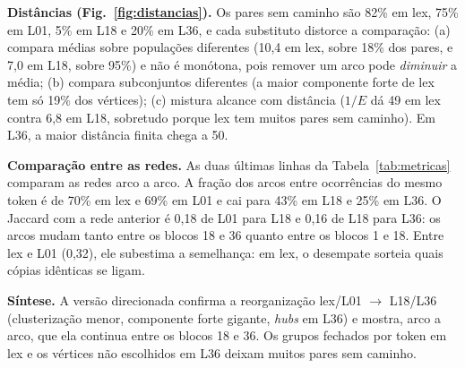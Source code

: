 \documentclass[11pt,a4paper]{article}
\begin{document}
\textbf{Distâncias (Fig.~\ref{fig:distancias}).} Os pares sem caminho são
82\% em lex, 75\% em L01, 5\% em L18 e 20\% em L36, e cada substituto distorce a comparação:
(a) compara médias sobre populações diferentes (10,4 em lex, sobre 18\% dos pares, e 7,0 em
L18, sobre 95\%) e não é monótona, pois remover um arco pode \emph{diminuir} a média;
(b) compara subconjuntos diferentes (a maior componente forte de lex tem só 19\% dos
vértices); (c) mistura alcance com distância ($1/E$ dá 49 em lex contra 6,8 em L18,
sobretudo porque lex tem muitos pares sem caminho). Em L36, a maior distância finita chega a
50.

\textbf{Comparação entre as redes.} As duas últimas linhas da Tabela~\ref{tab:metricas}
comparam as redes arco a arco. A fração dos arcos entre ocorrências do mesmo token é de 70\%
em lex e 69\% em L01 e cai para 43\% em L18 e 25\% em L36. O Jaccard com a rede anterior é 0,18 de L01
para L18 e 0,16 de L18 para L36: os arcos mudam tanto entre os blocos 18 e 36 quanto entre os
blocos 1 e 18. Entre lex e L01 (0,32), ele subestima a semelhança: em lex, o desempate sorteia
quais cópias idênticas se ligam.

\textbf{Síntese.} A versão direcionada confirma a reorganização lex/L01 $\to$ L18/L36
(clusterização menor, componente forte gigante, \textit{hubs} em L36) e mostra, arco a arco,
que ela continua entre os blocos 18 e 36. Os grupos fechados por token em lex e os vértices não escolhidos em
L36 deixam muitos pares sem caminho.
\end{document}
